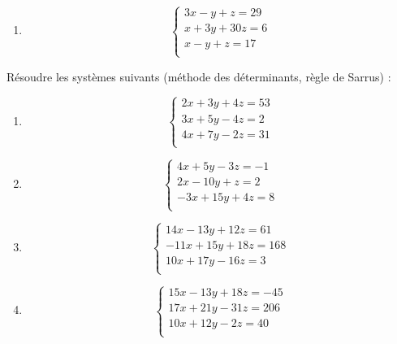 \begin{exercice}
\begin{multicols}{2}
\begin{enumerate}
\item $$\left\{ \begin{array}{l}
    3x-y+z=29 \\ 
   x+3y+30z=6 \\ 
   x-y+z=17 \\ 
\end{array} \right.$$ 
\end{enumerate}
\end{multicols}
\end{exercice}

\begin{exercice}
Résoudre les systèmes suivants (méthode des déterminants, règle de Sarrus) : 
\begin{multicols}{2}
\begin{enumerate}
\item $$\left\{ \begin{array}{l}
    2x+3y+4z=53 \\ 
   3x+5y-4z=2 \\ 
   4x+7y-2z=31 \\ 
\end{array} \right.$$

\item $$\left\{ \begin{array}{l}
    4x+5y-3z=-1 \\ 
   2x-10y+z=2 \\ 
   -3x+15y+4z=8 \\ 
\end{array} \right.$$
\item $$\left\{ \begin{array}{l}
    14x-13y+12z=61 \\ 
   -11x+15y+18z=168 \\ 
   10x+17y-16z=3 \\ 
\end{array} \right.$$

\item $$\left\{ \begin{array}{l}
    15x-13y+18z=-45 \\ 
   17x+21y-31z=206 \\ 
   10x+12y-2z=40 \\ 
\end{array} \right.$$ 
\end{enumerate}
\end{multicols}
\end{exercice}

